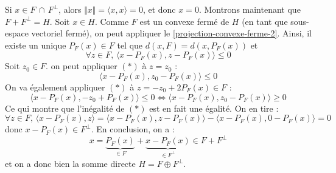 	\begin{demonstration}
		Si $x \in F \, \cap \, F^\perp$, alors $\Vert x \Vert = \langle x, x \rangle = 0$, et donc $x = 0$. Montrons maintenant que $F + F^\perp = H$. Soit $x \in H$. Comme $F$ est un convexe fermé de $H$ (en tant que sous-espace vectoriel fermé), on peut appliquer le \cref{projection-convexe-ferme-2}. Ainsi, il existe un unique $P_F(x) \in F$ tel que $d(x, F) = d(x, P_F(x))$ et
		\[ \forall z \in F, \, \langle x - P_F(x), z - P_F(x) \rangle \leq 0 \tag{$*$} \]
		Soit $z_0 \in F$. on peut appliquer $(*)$ à $z = z_0$ :
		\[ \langle x - P_F(x), z_0 - P_F(x) \rangle \leq 0 \]
		On va également appliquer $(*)$ à $z = -z_0 + 2P_F(x) \in F$ :
		\[ \langle x - P_F(x), -z_0 + P_F(x) \rangle \leq 0 \iff \langle x - P_F(x), z_0 - P_F(x) \rangle \geq 0 \]
		Ce qui montre que l'inégalité de $(*)$ est en fait une égalité. On en tire :
		\[ \forall z \in F, \, \langle x - P_F(x), z \rangle = \langle x - P_F(x), z - P_F(x) \rangle - \langle x - P_F(x), 0 - P_F(x) \rangle = 0 \]
		donc $x - P_F(x) \in F^\perp$. En conclusion, on a :
		\[ x = \underbrace{P_F(x)}_{\in F} + \underbrace{x - P_F(x)}_{\in F^\perp} \in F + F^\perp \]
		et on a donc bien la somme directe $H = F \oplus F^\perp$.
	\end{demonstration}

